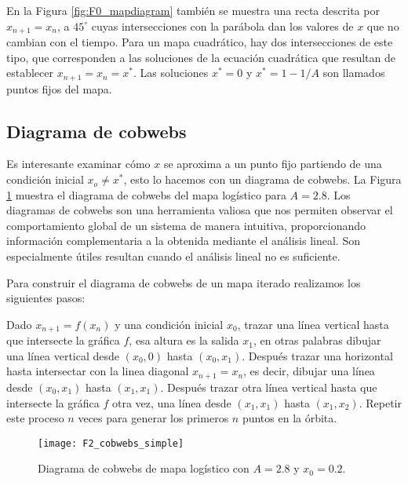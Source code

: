         En la Figura \ref{fig:F0_mapdiagram} también se muestra una recta descrita por $x_{n+1} = x_{n}$, a $45^{\circ}$ cuyas intersecciones con la parábola dan los valores de $x$ que no cambian con el tiempo. Para un mapa cuadrático, hay dos intersecciones de este tipo, que corresponden a las soluciones de la ecuación cuadrática que resultan de establecer $x_{n+1} = x_{n} = x^{*}$. Las soluciones $x^{*} = 0$ y $x^{*} = 1 - 1/A$ son llamados puntos fijos del mapa.

        \subsection{Diagrama de cobwebs}

            Es interesante examinar cómo $x$ se aproxima a un punto fijo partiendo de una condición inicial $x_{o} \neq x^{*}$, esto lo hacemos con un diagrama de cobwebs. La Figura \ref{fig:F2_cobwebs_simple} muestra el diagrama de cobwebs del mapa logístico para $A = 2.8$. Los diagramas de cobwebs son una herramienta valiosa que nos permiten observar el comportamiento global de un sistema de manera intuitiva, proporcionando información complementaria a la obtenida mediante el análisis lineal. Son especialmente útiles resultan cuando el análisis lineal no es suficiente.

            Para construir el diagrama de cobwebs de un mapa iterado realizamos los siguientes pasos:

            Dado $x_{n+1} = f(x_{n})$ y una condición inicial $x_{0}$, trazar una línea vertical hasta que intersecte la gráfica $f$, esa altura es la salida $x_{1}$, en otras palabras dibujar una línea vertical desde $(x_{0}, 0) $ hasta $(x_{0}, x_{1})$. Después trazar una horizontal hasta intersectar con la linea diagonal $x_{n+1} = x_{n}$, es decir, dibujar una línea desde  $(x_{0}, x_{1}) $ hasta $(x_{1}, x_{1})$. Después trazar otra línea vertical hasta que intersecte la gráfica $f$ otra vez, una línea desde $(x_{1}, x_{1}) $ hasta $(x_{1}, x_{2})$. Repetir este proceso $n$ veces para generar los primeros $n$ puntos en la órbita.

            \begin{figure}[hbtp]
                \caption{Diagrama de cobwebs de mapa logístico con $A = 2.8$ y $x_{0} = 0.2$.}
                \centering
                \texttt{[image: F2\_cobwebs\_simple]}
                \label{fig:F2_cobwebs_simple}
            \end{figure}

